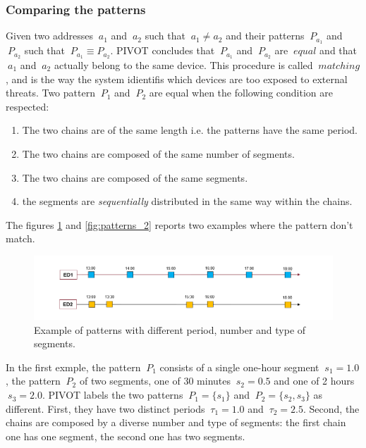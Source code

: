 \subsubsection{Comparing the patterns}
Given two addresses \(\ a_{1} \) and \(\ a_{2} \) such that \(\ a_{1} \neq a_{2} \) and their patterns \(\ P_{a_{1}} \) and \(\ P_{a_{2}} \) such that \(\ P_{a_{1}} \equiv  P_{a_{2}} \). PIVOT concludes that \(\ P_{a_{1}} \) and \(\ P_{a_{2}} \) are \(\ equal \) and that \(\ a_{1} \) and \(\ a_{2}\) actually belong to the same device. This procedure is called \(\ matching\), and is the way the system idientifis which devices are too exposed to external threats.
Two pattern \(\ P_{1} \) and \(\ P_{2} \) are equal when the following condition are respected:
\begin{enumerate}
	\item The two chains are of the same length i.e. the patterns have the same period.
	\item The two chains are composed of the same number of segments.
	\item The two chains are composed of the same segments.
	\item the segments are \textit{sequentially} distributed in the same way within the chains.
\end{enumerate}
The figures \ref{fig:patterns_1} and \ref{fig:patterns_2} reports two examples where the pattern don't match.

\vspace{3mm}
\begin{figure}[H]
    \centering
    \includegraphics[width=0.7\linewidth]{images/pivot/patterns.PNG}
    \caption{Example of patterns with different period, number and type of segments.}
    \label{fig:patterns_1}
\end{figure}
\vspace{3mm}

In the first exmple, the pattern \(\ P_{1} \) consists of a single one-hour segment \(\ s_{1} = 1.0 \), the pattern \(\ P_{2} \) of two segments, one of 30 minutes \(\ s_{2} = 0.5 \) and one of 2 hours \(\ s_{3} = 2.0 \). PIVOT labels the two patterns \(\ P_{1} = \{s_{1}\} \) and \(\ P_{2} = \{s_{2}, s_{3}\} \) as different. First, they have two distinct periods \(\ \tau_{1} = 1.0 \) and \(\ \tau_{2} = 2.5 \). Second, the chains are composed by a diverse number and type of segments: the first chain one has one segment, the second one has two segments.

